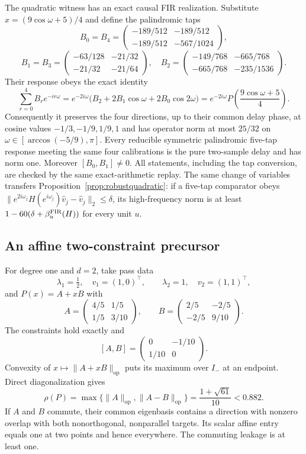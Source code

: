 \documentclass[11pt]{article}
\theoremstyle{remark}
\newcommand{\op}{\mathrm{op}}
\begin{document}
The quadratic witness has an exact causal FIR realization.  Substitute
$x=(9\cos\omega+5)/4$ and define the palindromic taps
\[
 B_0=B_4=\begin{pmatrix}-189/512&-189/512\\-189/512&-567/1024\end{pmatrix},
\]
\[
 B_1=B_3=\begin{pmatrix}-63/128&-21/32\\-21/32&-21/64\end{pmatrix},\quad
 B_2=\begin{pmatrix}-149/768&-665/768\\-665/768&-235/1536\end{pmatrix}.
\]
Their response obeys the exact identity
\[
 \sum_{r=0}^{4}B_re^{-ir\omega}
 =e^{-2i\omega}\bigl(B_2+2B_1\cos\omega+2B_0\cos2\omega\bigr)
 =e^{-2i\omega}P\!\left(\frac{9\cos\omega+5}{4}\right).
\]
Consequently it preserves the four directions, up to their common delay
phase, at cosine values $-1/3,-1/9,1/9,1$ and has operator norm at most $25/32$
on $\omega\in[\arccos(-5/9),\pi]$.  Every reducible symmetric palindromic
five-tap response meeting the same four calibrations is the pure two-sample
delay and has norm one.  Moreover $[B_0,B_1]\ne0$.  All statements, including
the tap conversion, are checked by the same exact-arithmetic replay.  The same
change of variables transfers Proposition~\ref{prop:robustquadratic}: if a
five-tap comparator obeys
$\|e^{2i\omega_j}H(e^{i\omega_j})\widehat v_j-\widehat v_j\|_2\le\delta$,
its high-frequency norm is at least
$1-60(\delta+\beta_u^{\rm FIR}(H))$ for every unit $u$.

\subsection{An affine two-constraint precursor}

For degree one and $d=2$, take pass data
\[
 \lambda_1=\tfrac12,\quad v_1=(1,0)^\top,
 \qquad \lambda_2=1,\quad v_2=(1,1)^\top,
\]
and $P(x)=A+xB$ with
\[
 A=\begin{pmatrix}4/5&1/5\\1/5&3/10\end{pmatrix},\qquad
 B=\begin{pmatrix}2/5&-2/5\\-2/5&9/10\end{pmatrix}.
\]
The constraints hold exactly and
\[
 [A,B]=\begin{pmatrix}0&-1/10\\1/10&0\end{pmatrix}.
\]
Convexity of $x\mapsto\|A+xB\|_{\op}$ puts its maximum over $I_-$ at an
endpoint.  Direct diagonalization gives
\[
 \rho(P)=\max\{\|A\|_{\op},\|A-B\|_{\op}\}
 =\frac{1+\sqrt{61}}{10}<0.882.
\]
If $A$ and $B$ commute, their common eigenbasis contains a direction with
nonzero overlap with both nonorthogonal, nonparallel targets.  Its scalar
affine entry equals one at two points and hence everywhere.  The commuting
leakage is at least one.
\end{document}
